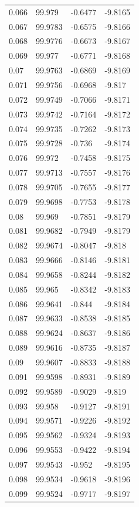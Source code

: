 \begin{tabular}{llll}
0.066 & 99.979 & -0.6477 & -9.8165 \\
0.067 & 99.9783 & -0.6575 & -9.8166 \\
0.068 & 99.9776 & -0.6673 & -9.8167 \\
0.069 & 99.977 & -0.6771 & -9.8168 \\
0.07 & 99.9763 & -0.6869 & -9.8169 \\
0.071 & 99.9756 & -0.6968 & -9.817 \\
0.072 & 99.9749 & -0.7066 & -9.8171 \\
0.073 & 99.9742 & -0.7164 & -9.8172 \\
0.074 & 99.9735 & -0.7262 & -9.8173 \\
0.075 & 99.9728 & -0.736 & -9.8174 \\
0.076 & 99.972 & -0.7458 & -9.8175 \\
0.077 & 99.9713 & -0.7557 & -9.8176 \\
0.078 & 99.9705 & -0.7655 & -9.8177 \\
0.079 & 99.9698 & -0.7753 & -9.8178 \\
0.08 & 99.969 & -0.7851 & -9.8179 \\
0.081 & 99.9682 & -0.7949 & -9.8179 \\
0.082 & 99.9674 & -0.8047 & -9.818 \\
0.083 & 99.9666 & -0.8146 & -9.8181 \\
0.084 & 99.9658 & -0.8244 & -9.8182 \\
0.085 & 99.965 & -0.8342 & -9.8183 \\
0.086 & 99.9641 & -0.844 & -9.8184 \\
0.087 & 99.9633 & -0.8538 & -9.8185 \\
0.088 & 99.9624 & -0.8637 & -9.8186 \\
0.089 & 99.9616 & -0.8735 & -9.8187 \\
0.09 & 99.9607 & -0.8833 & -9.8188 \\
0.091 & 99.9598 & -0.8931 & -9.8189 \\
0.092 & 99.9589 & -0.9029 & -9.819 \\
0.093 & 99.958 & -0.9127 & -9.8191 \\
0.094 & 99.9571 & -0.9226 & -9.8192 \\
0.095 & 99.9562 & -0.9324 & -9.8193 \\
0.096 & 99.9553 & -0.9422 & -9.8194 \\
0.097 & 99.9543 & -0.952 & -9.8195 \\
0.098 & 99.9534 & -0.9618 & -9.8196 \\
0.099 & 99.9524 & -0.9717 & -9.8197 \\

\end{tabular}
